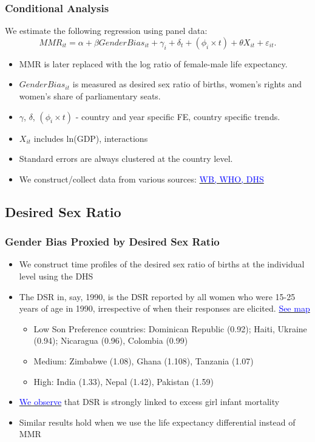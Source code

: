 \documentclass[10pt,letterpaper,subeqn]{beamer}
\begin{document}
\begin{frame}[label=CC]
\frametitle{Conditional Analysis}
We estimate the following regression using panel data:
	\begin{equation}
		MMR_{it} = \alpha + \beta GenderBias_{it} + \gamma_i + \delta_t + 
               (\phi_i\times t) + \theta X_{it} + \varepsilon_{it}. \nonumber
	\end{equation}
\vspace{4mm}
    \begin{itemize}
\setlength{\itemsep}{8pt}
	\item MMR is later replaced with the log ratio of female-male life expectancy.
  \item $GenderBias_{it}$ is measured as desired sex ratio of births, women's 
        rights and women's share of parliamentary seats.
	\item $\gamma$, $\delta$, $(\phi_i\times t)$ - country and year specific FE,
        country specific trends.  
  \item $X_{it}$ includes ln(GDP), interactions
	\item Standard errors are always clustered at the country level.
  \item We construct/collect data from various
        sources: \hyperlink{sumstatsWorld}{\textcolor{blue}{WB, WHO, DHS}}
\end{itemize}
\end{frame}


\subsection{Desired Sex Ratio}

\begin{frame}
\frametitle{Gender Bias Proxied by Desired Sex Ratio}
\begin{itemize}
\setlength{\itemsep}{15pt}
\item We construct time profiles of the desired sex ratio of births at the individual level using the DHS
\item The DSR in, say, 1990, is the DSR reported by all women who were 15-25 years of age in 1990, irrespective of when their responses are elicited.
{\footnotesize \hyperlink{DSRMap}{\textcolor{blue}{See map}}}
\begin{itemize}
\item Low Son Preference countries: Dominican Republic (0.92); Haiti, Ukraine (0.94); Nicaragua (0.96), Colombia (0.99) 
\item Medium: Zimbabwe (1.08), Ghana (1.108), Tanzania (1.07) 
\item High: India (1.33), Nepal (1.42), Pakistan (1.59)
\end{itemize}
\item \hyperlink{DSRIMR}{\textcolor{blue}{We observe}} that DSR is strongly linked to excess girl infant mortality
\item Similar results hold when we use the life expectancy differential instead of MMR
\end{itemize}
\end{frame}
\end{document}
